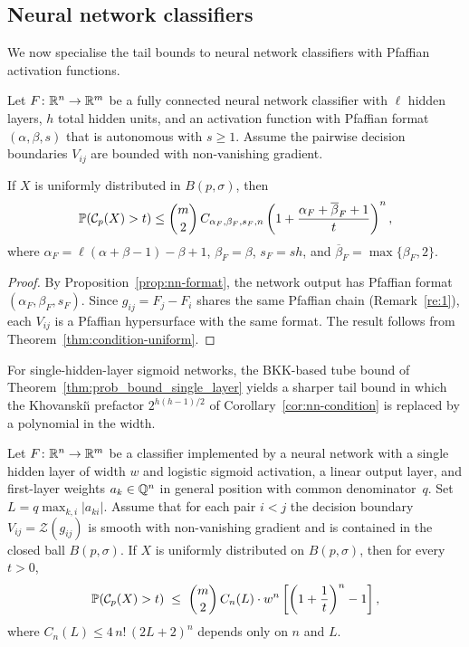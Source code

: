 \subsection{Neural network classifiers}
We now specialise the tail bounds to neural network classifiers with Pfaffian activation functions.

\begin{corollary}\label{cor:nn-condition}
Let $F\colon \mathbb{R}^n\to \mathbb{R}^m$ be a fully connected neural network classifier with $\ell$ hidden layers, $h$ total hidden units, and an activation function with Pfaffian format $(\alpha, \beta, s)$ that is autonomous with $s\geq 1$. Assume the pairwise decision boundaries $V_{ij}$ are bounded with non-vanishing gradient.

If $X$ is uniformly distributed in $B(p,\sigma)$, then
\begin{equation*}
  \mathbb{P}(\mathcal{C}_p(X) > t) \leq \binom{m}{2}\, C_{\alpha_F,\beta_F,s_F,n}\left(1 + \frac{\alpha_F + \overline{\beta}_F + 1}{t}\right)^n,
\end{equation*}
where $\alpha_F = \ell(\alpha+\beta-1)-\beta+1$, $\beta_F = \beta$, $s_F = sh$, and $\overline{\beta}_F = \max\{\beta_F, 2\}$.
\end{corollary}

\begin{proof}
By Proposition~\ref{prop:nn-format}, the network output has Pfaffian format $(\alpha_F, \beta_F, s_F)$. Since $g_{ij} = F_j - F_i$ shares the same Pfaffian chain (Remark~\ref{re:1}), each $V_{ij}$ is a Pfaffian hypersurface with the same format. The result follows from Theorem~\ref{thm:condition-uniform}.
\end{proof}

For single-hidden-layer sigmoid networks, the BKK-based tube bound of Theorem~\ref{thm:prob_bound_single_layer} yields a sharper tail bound in which the Khovanski\u\i{} prefactor $2^{h(h-1)/2}$ of Corollary~\ref{cor:nn-condition} is replaced by a polynomial in the width.

\begin{corollary}\label{cor:nn-condition-single-layer}
  Let $F\colon \mathbb{R}^n\to \mathbb{R}^m$ be a classifier implemented by a neural network with a single hidden layer of width $w$ and logistic sigmoid activation, a linear output layer, and first-layer weights $a_k\in\mathbb{Q}^n$ in general position with common denominator~$q$. Set $L=q\max_{k,i}|a_{ki}|$. Assume that for each pair $i<j$ the decision boundary $V_{ij}=\mathcal{Z}(g_{ij})$ is smooth with non-vanishing gradient and is contained in the closed ball $B(p,\sigma)$. If $X$ is uniformly distributed on $B(p,\sigma)$, then for every $t>0$,
  \begin{equation}\label{eq:single-layer-condition-bound}
    \mathbb{P}(\mathcal{C}_p(X)>t) \;\leq\; \binom{m}{2}\,C_n(L)\cdot w^n\left[\left(1+\frac{1}{t}\right)^n-1\right],
  \end{equation}
  where $C_n(L)\leq 4\,n!\,(2L+2)^n$ depends only on $n$ and $L$.
\end{corollary}

